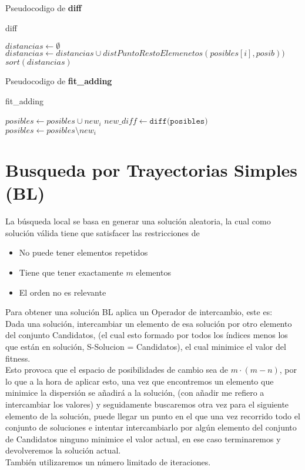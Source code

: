 Pseudocodigo de \textbf{diff}
\begin{algorithm}[H]
  \caption{diff}
  \begin{algorithmic}[1]
      \State $distancias \gets \emptyset$
        \State $distancias \gets distancias \cup distPuntoRestoElemenetos(posibles[i],posib))$
      \EndFor
      \State $sort(distancias)$
      \State {}
    \EndFunction
  \end{algorithmic}
\end{algorithm}

Pseudocodigo de \textbf{fit\_adding}

\begin{algorithm}[H]
  \caption{fit\_adding}
  \begin{algorithmic}[1]
      \State $posibles \gets posibles \cup new_i$
      \State $new\_diff \gets \texttt{diff(posibles)}$
      \State $posibles \gets posibles \setminus new_i$
      \State {}
    \EndFunction
  \end{algorithmic}
\end{algorithm}


\section{Busqueda por Trayectorias Simples (BL)}
La búsqueda local se basa en generar una solución aleatoria, la cual como solución válida tiene que satisfacer las restricciones de
\begin{itemize}
  \item No puede tener elementos repetidos
  \item Tiene que tener exactamente $m $ elementos
  \item El orden no es relevante
\end{itemize}
Para obtener una solución BL aplica un Operador de intercambio, este es:\\
Dada una solución, intercambiar un elemento de esa solución por otro elemento del conjunto Candidatos, (el cual
esto formado por todos los índices menos los que están en solución, S-Solucion = Candidatos), el cual minimice el valor del fitness.\\
Esto provoca que el espacio de posibilidades de cambio sea de  $m\cdot (m-n)$, por lo que a la hora de aplicar esto, una vez que
encontremos un elemento que minimice la dispersión se añadirá a la solución, (con añadir me refiero a intercambiar los valores) y
seguidamente buscaremos otra vez para el siguiente elemento de la solución, puede llegar un punto en el que una vez recorrido
todo el conjunto de soluciones e intentar intercambiarlo por algún elemento del conjunto de Candidatos ninguno minimice el valor
actual, en ese caso terminaremos y devolveremos la solución actual.\\
También utilizaremos un número limitado de iteraciones.
 
